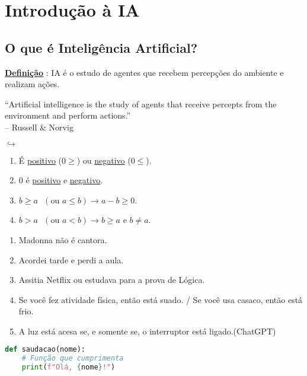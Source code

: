 \section{Introdução à IA}

\subsection{O que é Inteligência Artificial?}
\begin{conceptbox}
\underline{\underline{\textbf{Definição}}} : IA é o estudo de agentes que recebem percepções do ambiente e realizam ações.
\end{conceptbox}

\begin{quotebox}
“Artificial intelligence is the study of agents that receive percepts from the environment and perform actions.”\\
\hfill -- Russell \& Norvig
\end{quotebox}

$\hookrightarrow$

\begin{enumerate}
    \item É \underline{positivo} ($0 \geq $) ou \underline{negativo} ($0 \leq$).
    \item $0$ é \underline{positivo} e \underline{negativo}.
    \item $b \geq a \text{ }(\text{ou } a \leq b) \rightarrow a-b \geq 0$.
    \item $b > a \text{ }(\text{ou }  a < b) \rightarrow b \geq a \text{ e } b \ne a$.
\end{enumerate}

\begin{enumerate}[label=(\roman*)]
        \item Madonna não é cantora.
        \item Acordei tarde e perdi a aula.
        \item Assitia Netflix ou estudava para a prova de Lógica.
        \item Se você fez atividade física, então está suado. / Se você usa casaco, então está frio.
        \item A luz está acesa se, e somente se, o interruptor está ligado.(ChatGPT)
\end{enumerate} 

\begin{lstlisting}[style=dracula, language=Python]
def saudacao(nome):
    # Função que cumprimenta
    print(f"Olá, {nome}!")
\end{lstlisting}

